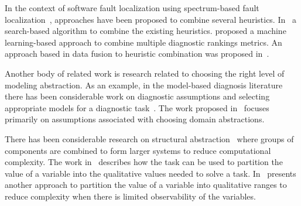 In the context of software fault localization using spectrum-based
fault localization~\citep{abreu2007accuracy}, approaches have been
proposed to combine several heuristics. In~\citep{wang2011search} a
search-based algorithm to combine the existing
heuristics. \cite{xuan2014learning} proposed a machine learning-based
approach to combine multiple diagnostic rankings metrics. An approach
based in data fusion to heuristic combination was proposed
in~\citep{lo2014fusion}.

Another body of related work is research related to choosing the right level of
modeling abstraction. As an example, in the model-based diagnosis literature
there has been considerable work on diagnostic assumptions and selecting appropriate
models for a diagnostic task~\citep{struss1992s}. The work proposed in~\citep{de2007dynamic}
focuses primarily on assumptions associated with choosing domain abstractions.

There has been considerable research on structural
abstraction~\citep{chittaro2004hierarchical,hamscher1990xde} where
groups of components are combined to form larger systems to reduce
computational complexity. The work in~\citep{sachenbacher2005task}
describes how the task can be used to partition the value of a
variable into the qualitative values needed to solve a
task. In~\citep{torta2003automatic} presents another approach to
partition the value of a variable into qualitative ranges to reduce
complexity when there is limited observability of the variables.
